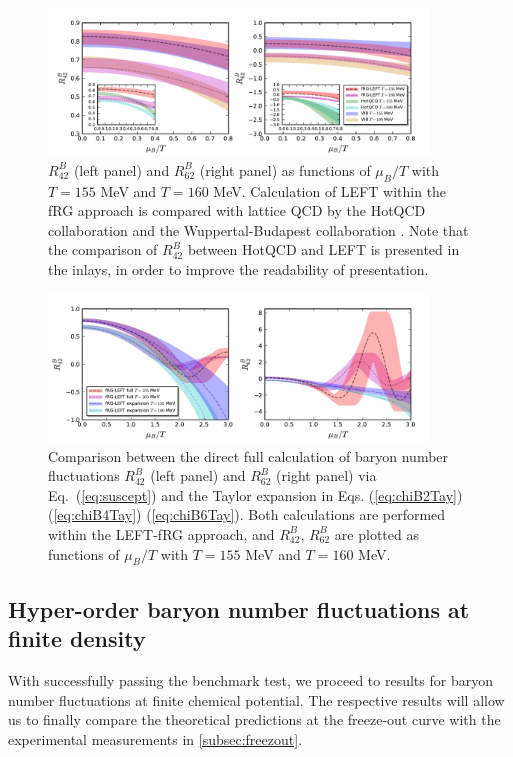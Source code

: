 \documentclass[%
reprint,
superscriptaddress,
showpacs,preprintnumbers,
amsmath,amssymb,
aps,
prd,
]{revtex4-1}
\def\Eq#1{Eq.~(\ref{#1})}
\begin{document}
%
\begin{figure}[t]
\includegraphics[width=0.9\textwidth]{R42R62-muBoT}
\caption{$R^{B}_{42}$ (left panel) and $R^{B}_{62}$ (right panel) as functions of $\mu_B/T$ with $T=155$ MeV and $T=160$ MeV. Calculation of LEFT within the fRG approach is compared with lattice QCD by the HotQCD collaboration \cite{Bazavov:2020bjn} and the Wuppertal-Budapest collaboration \cite{Borsanyi:2018grb}. Note that the comparison of $R^{B}_{42}$ between HotQCD and LEFT is presented in the inlays, in order to improve the readability of presentation.}\label{fig:R42R62-muBoT}
\end{figure}
%



	
%
\begin{figure}[t]
\includegraphics[width=0.9\textwidth]{R42R62expansion-muBoT}
\caption{Comparison between the direct full calculation of baryon number fluctuations $R^{B}_{42}$ (left panel) and $R^{B}_{62}$ (right panel) via \Eq{eq:suscept} and the Taylor expansion in Eqs. (\ref{eq:chiB2Tay})  (\ref{eq:chiB4Tay})  (\ref{eq:chiB6Tay}). Both calculations are performed within the LEFT-fRG approach, and $R^{B}_{42}$, $R^{B}_{62}$ are plotted as functions of $\mu_B/T$ with $T=155$ MeV and $T=160$ MeV.}\label{fig:R42R62expansion-muBoT}
\end{figure}
%

\subsection{Hyper-order baryon number fluctuations at finite  density}
\label{subsec:hyper-ordermuB}
With successfully passing the benchmark test, we proceed to results for baryon number fluctuations at finite chemical potential. The respective results will allow us to finally compare the theoretical predictions at the freeze-out curve with the experimental measurements in \autoref{subsec:freezout}. 
\end{document}
